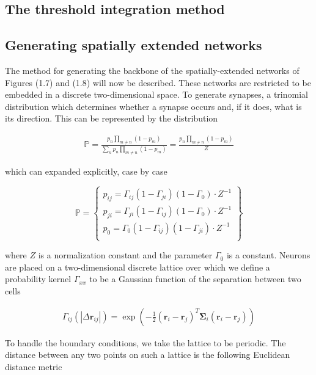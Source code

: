 \documentclass{ucetd}
\begin{document}
\subsection{The threshold integration method}

\subsection{Generating spatially extended networks}

The method for generating the backbone of the spatially-extended networks of Figures (1.7) and (1.8) will now be described. These networks are restricted to be embedded in a discrete two-dimensional space. To generate synapses, a trinomial distribution which determines whether a synapse occurs and, if it does, what is its direction. This can be represented by the distribution

\begin{align}
\mathbb{P} = \frac{p_{n}\prod_{m\neq n}(1-p_{m})}{\sum_{n}p_{n}\prod_{m\neq n}(1-p_{m})} = \frac{p_{n}\prod_{m\neq n}(1-p_{m})}{Z}
\end{align}

which can expanded explicitly, case by case

\begin{equation}
    \mathbb{P} = \left\{\begin{array}{lr}
        p_{ij} = \Gamma_{ij}(1-\Gamma_{ji})(1-\Gamma_{0})\cdot Z^{-1}\\
        p_{ji} = \Gamma_{ji}(1-\Gamma_{ij})(1-\Gamma_{0})\cdot Z^{-1}\\
        p_{0} = \Gamma_{0}(1-\Gamma_{ij})(1-\Gamma_{ji})\cdot Z^{-1}\\
        \end{array}\right\}
\end{equation}

where $Z$ is a normalization constant and the parameter $\Gamma_{0}$ is a constant. Neurons are placed on a two-dimensional discrete lattice over which we define a probability kernel $\Gamma_{xx}$ to be a Gaussian function of the separation between two cells

\begin{align}
\Gamma_{ij}(|\Delta\mathbf{r}_{ij}|) = \exp\left(-\frac{1}{2}(\mathbf{r}_{i}-\mathbf{r}_{j})^{T}\mathbf{\Sigma}_{i}(\mathbf{r}_{i}-\mathbf{r}_{j})\right)
\end{align}

To handle the boundary conditions, we take the lattice to be periodic. The distance between any two points on such a lattice is the following Euclidean distance metric
\end{document}
